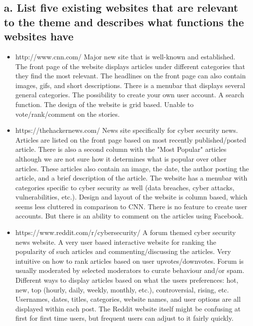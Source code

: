 \documentclass{article}
\begin{document}
\subsection{a. List five existing websites that are relevant to the theme and describes what functions the websites have}
\begin{itemize}
    \item %
    http://www.cnn.com/
    Major new site that is well-known and established.  The front page of the website displays articles under different categories that they find the most relevant.  The headlines on the front page can also contain images, gifs, and short descriptions.  There is a menubar that displays several general categories.  The possibility to create your own user account.  A search function.  The design of the website is grid based.  Unable to vote/rank/comment on the stories.

    \item %
    https://thehackernews.com/
    News site specifically for cyber security news.  Articles are listed on the front page based on most recently published/posted article.  There is also a second column with the "Most Popular" articles although we are not sure how it determines what is popular over other articles.  These articles also contain an image, the date, the author posting the article, and a brief description of the article.  The website has a menubar with categories specific to cyber security as well (data breaches, cyber attacks, vulnerabilities, etc.). Design and layout of the website is column based, which seems less cluttered in comparison to CNN.  There is no feature to create user accounts.  But there is an ability to comment on the articles using Facebook.
    
    \item %
    https://www.reddit.com/r/cybersecurity/
    A forum themed cyber security news website.  A very user based interactive website for ranking the popularity of such articles and commenting/discussing the articles.  Very intuitive on how to rank articles based on user upvotes/downvotes.  Forum is usually moderated by selected moderators to curate behaviour and/or spam.  Different ways to display articles based on what the users preferences: hot, new, top (hourly, daily, weekly, monthly, etc.), controversial, rising, etc. Usernames, dates, titles, categories, website names, and user options are all displayed within each post.  The Reddit website itself might be confusing at first for first time users, but frequent users can adjust to it fairly quickly.
    

\end{itemize}
\end{document}
